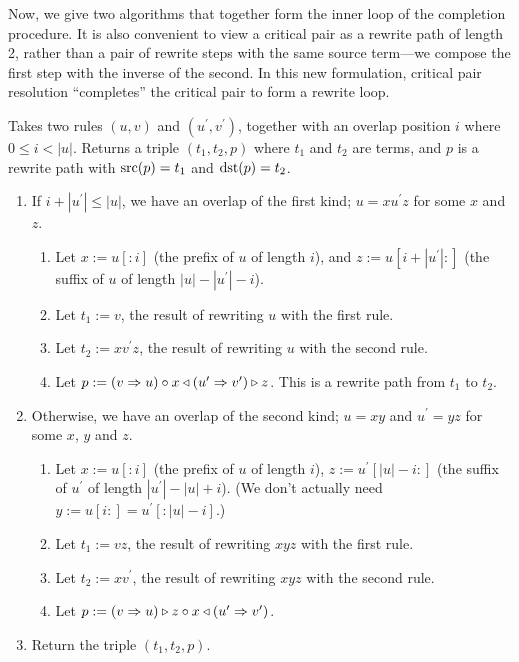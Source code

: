 \documentclass[../generics]{subfiles}
\begin{document}
Now, we give two algorithms that together form the inner loop of the completion procedure. It is also convenient to view a critical pair as a rewrite path of length 2, rather than a pair of rewrite steps with the same source term---we compose the first step with the inverse of the second. In this new formulation, critical pair resolution ``completes'' the critical pair to form a rewrite loop.

\begin{algorithm}\label{critical pair algo}
Takes two rules $(u, v)$ and $(u^\prime, v^\prime)$, together with an overlap position $i$ where $0\leq i<|u|$. Returns a triple $(t_1, t_2, p)$ where $t_1$ and $t_2$ are terms, and $p$ is a rewrite path with $\operatorname{src}(p)=t_1$ and $\operatorname{dst}(p)=t_2$.
\begin{enumerate}
\item If $i+|u^\prime|\leq|u|$, we have an overlap of the first kind; $u=xu^\prime z$ for some $x$ and $z$.
\begin{enumerate}
\item Let $x:=u[:i]$ (the prefix of $u$ of length $i$), and $z:=u[i+|u^\prime|:]$ (the suffix of $u$ of length $|u|-|u^\prime|-i$).
\item Let $t_1:=v$, the result of rewriting $u$ with the first rule.
\item Let $t_2:=xv^\prime z$, the result of rewriting $u$ with the second rule.
\item Let $p:=(v\Rightarrow u)\circ x\triangleleft(u^\prime\Rightarrow v^\prime)\triangleright z$. This is a rewrite path from $t_1$ to $t_2$.
\end{enumerate}
\item Otherwise, we have an overlap of the second kind; $u=xy$ and $u^\prime=yz$ for some $x$, $y$ and $z$.
\begin{enumerate}
\item Let $x:=u[:i]$ (the prefix of $u$ of length $i$), $z:=u^\prime[|u|-i:]$ (the suffix of $u^\prime$ of length $|u^\prime|-|u|+i$). (We don't actually need $y:=u[i:]=u^\prime[:|u|-i]$.)
\item Let $t_1:=vz$, the result of rewriting $xyz$ with the first rule.
\item Let $t_2:=xv^\prime$, the result of rewriting $xyz$ with the second rule.
\item Let $p:=(v\Rightarrow u)\triangleright z\circ x\triangleleft(u^\prime\Rightarrow v^\prime)$.
\end{enumerate}
\item Return the triple $(t_1, t_2, p)$.
\end{enumerate}
\end{algorithm}
\end{document}
